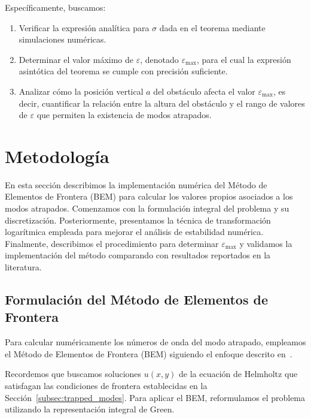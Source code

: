 \documentclass[11pt]{article}
\begin{document}
Específicamente, buscamos:

\begin{enumerate}
    \item Verificar la expresión analítica para $\sigma$ dada en el teorema mediante simulaciones numéricas.
    \item Determinar el valor máximo de $\varepsilon$, denotado $\varepsilon_{\max}$, para el cual la expresión asintótica del teorema se cumple con precisión suficiente.
    \item Analizar cómo la posición vertical $a$ del obstáculo afecta el valor $\varepsilon_{\max}$, es decir, cuantificar la relación entre la altura del obstáculo y el rango de valores de $\varepsilon$ que permiten la existencia de modos atrapados.
\end{enumerate}


\section{Metodología}\label{sec:metodologia}

En esta sección describimos la implementación numérica del Método de Elementos de Frontera (BEM) para calcular los valores propios asociados a los modos atrapados. Comenzamos con la formulación integral del problema y su discretización. Posteriormente, presentamos la técnica de transformación logarítmica empleada para mejorar el análisis de estabilidad numérica. Finalmente, describimos el procedimiento para determinar $\varepsilon_{\max}$ y validamos la implementación del método comparando con resultados reportados en la literatura.

\subsection{Formulación del Método de Elementos de Frontera} \label{sub:formulation}

Para calcular numéricamente los números de onda del modo atrapado, empleamos el Método de Elementos de Frontera (BEM) siguiendo el enfoque descrito en~\cite{Linton1992}.

Recordemos que buscamos soluciones $u(x,y)$ de la ecuación de Helmholtz que satisfagan las condiciones de frontera establecidas en la Sección~\ref{subsec:trapped_modes}. Para aplicar el BEM, reformulamos el problema utilizando la representación integral de Green.
\end{document}
